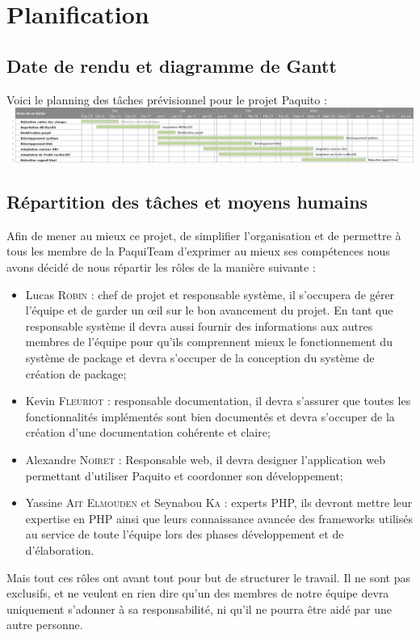 \documentclass[12pt,a4paper]{article}
\begin{document}
		
\section{Planification}
	\subsection{Date de rendu et diagramme de Gantt}
	Voici le planning des tâches prévisionnel pour le projet Paquito :\\
	\includegraphics[width=1\textwidth]{../img/gantt.png}
	
	\subsection{Répartition des tâches et moyens humains}
	Afin de mener au mieux ce projet, de simplifier l'organisation et de permettre à tous les membre de la PaquiTeam d'exprimer au mieux ses compétences nous avons décidé de nous répartir les rôles de la manière suivante :
	\begin{itemize}\renewcommand{\labelitemi}{$\bullet$}
		\item Lucas \textsc{Robin} : chef de projet et responsable système, il s'occupera de gérer l'équipe et de garder un \oe{}il sur le bon avancement du projet. En tant que responsable système il devra aussi fournir des informations aux autres membres de l'équipe pour qu'ils comprennent mieux le fonctionnement du système de package et devra s'occuper de la conception du système de création de package;
		\item Kevin \textsc{Fleuriot} : responsable documentation, il devra s'assurer que toutes les fonctionnalités implémentés sont bien documentés et devra s'occuper de la création d'une documentation cohérente et claire;
		\item Alexandre \textsc{Noiret} : Responsable web, il devra designer l'application web permettant d'utiliser Paquito et coordonner son développement;
		\item Yassine \textsc{Ait Elmouden} et Seynabou \textsc{Ka} : experts PHP, ils devront mettre leur expertise en PHP ainsi que leurs connaissance avancée des frameworks utilisés au service de toute l'équipe lors des phases dévelop\-pement et de d'élaboration.
	\end{itemize}
	
	Mais tout ces rôles ont avant tout pour but de structurer le travail. Il ne sont pas exclusifs, et ne veulent en rien dire qu'un des membres de notre équipe devra uniquement s'adonner à sa responsabilité, ni qu'il ne pourra être aidé par une autre personne.
\end{document}
